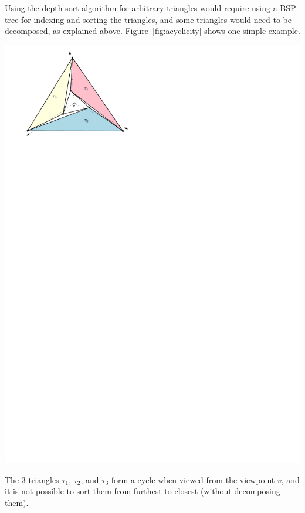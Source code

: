 Using the depth-sort algorithm for arbitrary triangles would require using a BSP-tree for indexing and sorting the triangles, and some triangles would need to be decomposed, as explained above.
Figure~\ref{fig:acyclicity} shows one simple example.
\begin{marginfigure}
  \centering
  \includegraphics[width=\linewidth]{acyclicity.pdf}
  \caption{The 3 triangles $\tau_1$, $\tau_2$, and $\tau_3$ form a cycle when viewed from the viewpoint $v$, and it is not possible to sort them from furthest to closest (without decomposing them).}%
  \label{fig:acyclicity}
\end{marginfigure}

%

